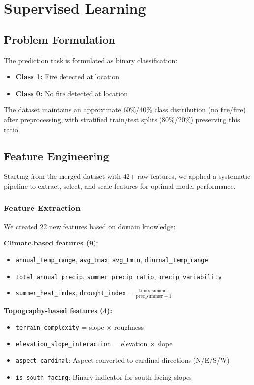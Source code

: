 \chapter{Supervised Learning}

\section{Problem Formulation}
The prediction task is formulated as binary classification:
\begin{itemize}
    \item \textbf{Class 1:} Fire detected at location
    \item \textbf{Class 0:} No fire detected at location
\end{itemize}

The dataset maintains an approximate 60\%/40\% class distribution (no fire/fire) after preprocessing, with stratified train/test splits (80\%/20\%) preserving this ratio.

\section{Feature Engineering}

Starting from the merged dataset with 42+ raw features, we applied a systematic pipeline to extract, select, and scale features for optimal model performance.

\subsection{Feature Extraction}
We created 22 new features based on domain knowledge:

\textbf{Climate-based features (9):}
\begin{itemize}
    \item \texttt{annual\_temp\_range}, \texttt{avg\_tmax}, \texttt{avg\_tmin}, \texttt{diurnal\_temp\_range}
    \item \texttt{total\_annual\_precip}, \texttt{summer\_precip\_ratio}, \texttt{precip\_variability}
    \item \texttt{summer\_heat\_index}, \texttt{drought\_index} = $\frac{\text{tmax\_summer}}{\text{prec\_summer} + 1}$
\end{itemize}

\textbf{Topography-based features (4):}
\begin{itemize}
    \item \texttt{terrain\_complexity} = slope $\times$ roughness
    \item \texttt{elevation\_slope\_interaction} = elevation $\times$ slope
    \item \texttt{aspect\_cardinal}: Aspect converted to cardinal directions (N/E/S/W)
    \item \texttt{is\_south\_facing}: Binary indicator for south-facing slopes
\end{itemize}

